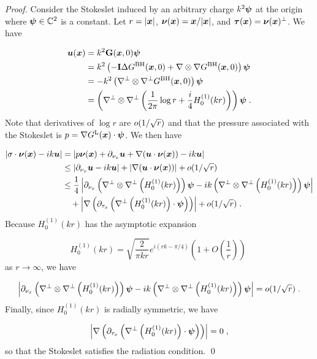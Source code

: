 \begin{proof}
Consider the Stokeslet induced by an arbitrary charge
$k^2 {\boldsymbol \psi}$ at the origin where ${\boldsymbol \psi} \in \mathbb{C}^2$ 
is a constant. Let $r = |{\boldsymbol x}|$,
${\boldsymbol \nu}({\boldsymbol x}) = {\boldsymbol x}/|{\boldsymbol x}|$, and ${\boldsymbol \tau}({\boldsymbol x}) = {\boldsymbol \nu}({\boldsymbol x})^\perp$. We have

\begin{align*}
{\boldsymbol u} ({\boldsymbol x}) &= k^2 {\bf G}({\boldsymbol x},0) {\boldsymbol \psi} \\
&= k^2 \left (-{\bf I} \Delta G^{\textrm{BH}}({\boldsymbol x},0)
+ \nabla \otimes \nabla G^{\textrm{BH}}({\boldsymbol x},0)\right ) {\boldsymbol \psi} \\
&= -k^2 \left (\nabla^\perp \otimes \nabla^\perp G^{\textrm{BH}}({\boldsymbol x},0) \right) {\boldsymbol \psi} \\
&= \left(\nabla^\perp \otimes \nabla^\perp \left ( \frac{1}{2\pi}
\log r + \frac{i}{4} H_0^{(1)} (kr) \right ) \right){\boldsymbol \psi} \; .
\end{align*}
Note that derivatives of $\log r$ are $o (1/\sqrt{r})$
and that the pressure associated with the Stokeslet is
$p = \nabla G^{\textrm{L}}({\boldsymbol x}) \cdot {\boldsymbol \psi}$. We then have

\begin{align*}
\left | \sigma \cdot {\boldsymbol \nu}({\boldsymbol x}) - i k {\boldsymbol u} \right | &=
\left | p {\boldsymbol \nu}({\boldsymbol x}) + \partial_{{\nu_x}} {\boldsymbol u} + \nabla ({\boldsymbol u} \cdot {\boldsymbol \nu}({\boldsymbol x}))
- ik {\boldsymbol u} \right | \\
&\leq \left | \partial_{{\nu_x}} {\boldsymbol u} - ik{\boldsymbol u} \right | + \left | \nabla({\boldsymbol u} \cdot {\boldsymbol \nu}({\boldsymbol x})) \right |
+ o (1/\sqrt{r}) \\
&\leq \frac{1}{4} \left | \partial_{{\nu_x}} \left(\nabla^\perp \otimes
\nabla^\perp \left (H_0^{(1)} (kr) \right ) \right){\boldsymbol \psi}
- i k \left(\nabla^\perp \otimes \nabla^\perp
\left (H_0^{(1)} (kr) \right ) \right){\boldsymbol \psi} \right | \\
& \quad + \left | \nabla \left( \partial_{\tau_x} \left ( 
\nabla^\perp \left (H_0^{(1)} (kr) \right ) \cdot {\boldsymbol \psi}  \right )
\right) \right | + o (1/\sqrt{r}) \; .
\end{align*}
Because $H_0^{(1)}(kr)$ has the asymptotic expansion 

\begin{equation}
H_0^{(1)}(kr) = \sqrt{\frac{2}{\pi k r}} e^{i(rk-\pi/4)} \left ( 1 + O\left (
\frac{1}{r} \right ) \right ) \; \nonumber
\end{equation}
as $r\to \infty$, we have

\begin{equation}
\left | \partial_{{\nu_x}} \left(\nabla^\perp \otimes
\nabla^\perp \left (H_0^{(1)} (kr) \right ) \right){\boldsymbol \psi}
- ik \left(\nabla^\perp \otimes \nabla^\perp
\left (H_0^{(1)} (kr) \right ) \right){\boldsymbol \psi} \right | =
o ( 1/\sqrt{r} ) \; . \nonumber
\end{equation}
Finally, since $H_0^{(1)}(kr)$ is radially symmetric,
we have

\begin{equation}
\left | \nabla \left( \partial_{\tau_x} \left ( 
\nabla^\perp \left (H_0^{(1)} (kr) \right ) \cdot {\boldsymbol \psi}  \right )
\right) \right | = 0 \; , \nonumber
\end{equation}
so that the Stokeslet satisfies the radiation condition.
\qed
\end{proof}
